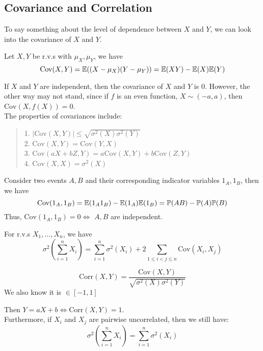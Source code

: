 \subsection{Covariance and Correlation}
To say something about the level of dependence between $X$ and $Y$, we can look into the covariance of $X$ and $Y$.
\begin{definition}
    Let $X, Y$ be r.v.s with $\mu_X, \mu_Y$, we have
    $$\text{Cov}(X, Y) = \mathbb{E}((X - \mu_X)(Y - \mu_Y)) = \mathbb{E}(XY) - \mathbb{E}(X)\mathbb{E}(Y)$$
\end{definition}
If $X$ and $Y$ are independent, then the covariance of $X$ and $Y$ is $0$. However, the other way may not stand, since if $f$ is an even function, $X \sim (-a, a)$, then $\text{Cov}(X, f(X)) = 0$. \\
The properties of covariances include:
\begin{quote}
    1. $|\text{Cov}(X,Y)| \le \sqrt{\sigma^2(X)\sigma^2(Y)}$ \\
    2. $\text{Cov}(X, Y) = \text{Cov}(Y, X)$ \\
    3. $\text{Cov}(aX + bZ, Y) = a \text{Cov}(X, Y) + b \text{Cov}(Z, Y)$ \\
    4. $\text{Cov}(X, X) = \sigma^2(X)$
\end{quote}
Consider two events $A, B$ and their corresponding indicator variables $1_A, 1_B$, then we have
$$\text{Cov}(1_A, 1_B) = \mathbb{E}(1_A1_B) - \mathbb{E}(1_A)\mathbb{E}(1_B) = \mathbb{P}(AB) - \mathbb{P}(A)\mathbb{P}(B)$$
Thus, $\text{Cov}(1_A, 1_B) = 0 \iff$ $A, B$ are independent.
\begin{theorem}
    For r.v.s $X_1, \dots, X_n$, we have
    $$\sigma^2(\sum_{i = 1}^{n} X_i) = \sum_{i = 1}^{n} \sigma^2(X_i) + 2 \sum_{1 \le i < j \le n} \text{Cov}(X_i, X_j)$$
\end{theorem}
\begin{definition}
    $$\text{Corr}(X, Y) = \frac{\text{Cov}(X, Y)}{\sqrt{\sigma^2(X)\sigma^2(Y)}}$$
    We also know it is $\in [-1, 1]$
\end{definition}
Then $Y = aX + b \iff \text{Corr}(X, Y) = 1$. \\
Furthermore, if $X_i$ and $X_j$ are pairwise uncorrelated, then we still have:
$$\sigma^2(\sum_{i = 1}^{n} X_i) = \sum_{i = 1}^{n} \sigma^2(X_i)$$
\newpage
